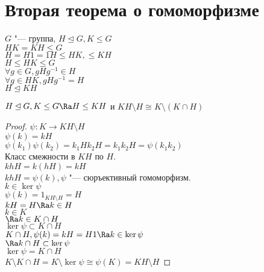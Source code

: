 ﻿\section{Вторая теорема о гомоморфизме}
$G$ "--- группа, $H \unlhd G, K \le G$\\
$HK = KH \le G$\\
$H = H1 = 1H \le HK, \le KH$\\

$H \le HK \le G$\\
$\forall g \in G, gHg^{-1} \in H$\\
$\forall g \in HK, gHg^{-1} = H$\\
$H \unlhd KH$\\
\begin{theorem}
$H \unlhd G, K \le G \Ra H \le KH$ и $KH\setminus H \cong K \setminus (K \cap H)$\\
\end{theorem}
\begin{proof}
$\psi \colon K \to KH \setminus H$\\
$\psi(k) = kH$\\
$\psi(k_1)\psi(k_2) = k_1Hk_2H = k_1k_2H = \psi(k_1k_2)$\\

Класс смежности в $KH$ по $H$.\\
$khH = k(hH) = kH$\\
$khH = \psi(k), \psi$ "--- сюръективный гомоморфизм.\\

$k \in \ker \psi$\\
$\psi(k) = 1_{KH \setminus H} = H$\\
$kH = H \Ra k \in H$\\
$k \in K$\\
$\Ra k \in  K \cap H$\\

$\ker \psi \subset K \cap H$\\
$K \cap H, \psi(k) = kH = H1 \Ra k \in \ker \psi$\\
$\Ra k \cap H \subset \ker \psi$\\
$\ker \psi = K \cap H$\\

$K \setminus K \cap H = K \setminus \ker \psi \cong \psi(K) = KH\setminus H$
\end{proof}
